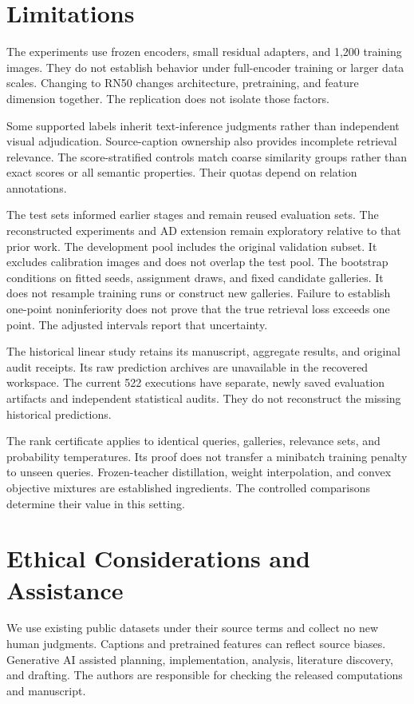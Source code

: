 \section*{Limitations}
The experiments use frozen encoders, small residual adapters, and 1,200 training images.
They do not establish behavior under full-encoder training or larger data scales.
Changing to RN50 changes architecture, pretraining, and feature dimension together.
The replication does not isolate those factors.

Some supported labels inherit text-inference judgments rather than independent visual adjudication.
Source-caption ownership also provides incomplete retrieval relevance.
The score-stratified controls match coarse similarity groups rather than exact scores or all semantic properties.
Their quotas depend on relation annotations.

The test sets informed earlier stages and remain reused evaluation sets.
The reconstructed experiments and AD extension remain exploratory relative to that prior work.
The development pool includes the original validation subset.
It excludes calibration images and does not overlap the test pool.
The bootstrap conditions on fitted seeds, assignment draws, and fixed candidate galleries.
It does not resample training runs or construct new galleries.
Failure to establish one-point noninferiority does not prove that the true retrieval loss exceeds one point.
The adjusted intervals report that uncertainty.

The historical linear study retains its manuscript, aggregate results, and original audit receipts.
Its raw prediction archives are unavailable in the recovered workspace.
The current 522 executions have separate, newly saved evaluation artifacts and independent statistical audits.
They do not reconstruct the missing historical predictions.

The rank certificate applies to identical queries, galleries, relevance sets, and probability temperatures.
Its proof does not transfer a minibatch training penalty to unseen queries.
Frozen-teacher distillation, weight interpolation, and convex objective mixtures are established ingredients.
The controlled comparisons determine their value in this setting.

\section*{Ethical Considerations and Assistance}
We use existing public datasets under their source terms and collect no new human judgments.
Captions and pretrained features can reflect source biases.
Generative AI assisted planning, implementation, analysis, literature discovery, and drafting.
The authors are responsible for checking the released computations and manuscript.

